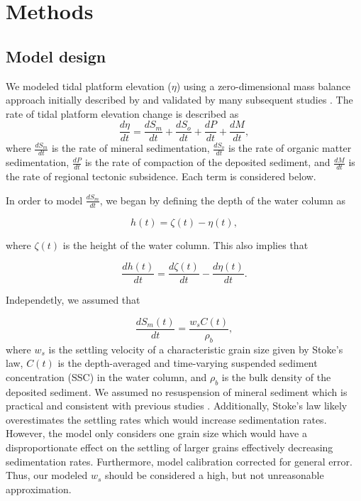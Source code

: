 \section{Methods}

\subsection{Model design}

We modeled tidal platform elevation ($\eta$) using a zero-dimensional mass balance approach initially described by \citet{kroneMethodSimulatingMarsh1987} and validated by many subsequent studies \citep{allenSaltmarshGrowthStratification1990, frenchNumericalSimulationVertical1993, temmermanModellingLongtermTidal2003,temmermanModellingEstuarineVariations2004}. The rate of tidal platform elevation change is described as
\begin{equation}\label{eq1}
	\frac{d\eta}{dt} = \frac{dS_m}{dt} + \frac{dS_o}{dt} + \frac{dP}{dt} + \frac{dM}{dt},
\end{equation}
where $\frac{dS_m}{dt}$ is the rate of mineral sedimentation, $\frac{dS_o}{dt}$ is the rate of organic matter sedimentation, $\frac{dP}{dt}$ is the rate of compaction of the deposited sediment, and $\frac{dM}{dt}$ is the rate of regional tectonic subsidence. Each term is considered below.

In order to model $\frac{dS_m}{dt}$, we began by defining the depth of the water column as

\begin{equation}\label{eq2}
	h(t) = \zeta(t) - \eta(t),
\end{equation}

where $\zeta(t)$ is the height of the water column. This also implies that

\begin{equation}\label{eq3}
	\frac{dh(t)}{dt} = \frac{d\zeta(t)}{dt} - \frac{d\eta(t)}{dt}.
\end{equation}

Independetly, we assumed that

\begin{equation}\label{eq4}
	\frac{dS_m(t)}{dt} = \frac{w_s C(t)}{\rho_b},
\end{equation}
where $w_s$ is the settling velocity of a characteristic grain size given by Stoke's law, $C(t)$ is the depth-averaged and time-varying suspended sediment concentration (SSC) in the water column, and $\rho_b$ is the bulk density of the deposited sediment. We assumed no resuspension of mineral sediment which is practical and consistent with previous studies \citep{kroneMethodSimulatingMarsh1987, allenSaltmarshGrowthStratification1990, frenchNumericalSimulationVertical1993, temmermanModellingLongtermTidal2003, temmermanModellingEstuarineVariations2004}. Additionally, Stoke's law likely overestimates the settling rates which would increase sedimentation rates. However, the model only considers one grain size which would have a disproportionate effect on the settling of larger grains effectively decreasing sedimentation rates. Furthermore, model calibration corrected for general error. Thus, our modeled $w_s$ should be considered a high, but not unreasonable approximation.

